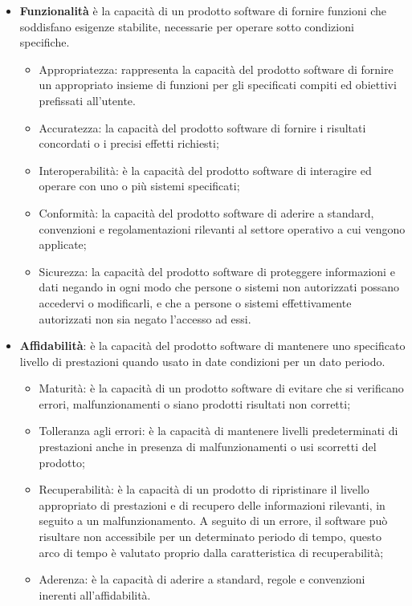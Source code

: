\begin{itemize}
\item \textbf{Funzionalità} è la capacità di un prodotto software di fornire funzioni che soddisfano esigenze stabilite, necessarie per operare sotto condizioni specifiche.
\begin{itemize}
\item Appropriatezza: rappresenta la capacità del prodotto software di fornire un appropriato insieme di funzioni per gli specificati compiti ed obiettivi prefissati all'utente.
\item Accuratezza: la capacità del prodotto software di fornire i risultati concordati o i precisi effetti richiesti;
\item Interoperabilità: è la capacità del prodotto software di interagire ed operare con uno o più sistemi specificati;
\item Conformità: la capacità del prodotto software di aderire a standard, convenzioni e regolamentazioni rilevanti al settore operativo a cui vengono applicate;
\item Sicurezza: la capacità del prodotto software di proteggere informazioni e dati negando in ogni modo che persone o sistemi non autorizzati possano accedervi o modificarli, e che a persone o sistemi effettivamente autorizzati non sia negato l’accesso ad essi.
\end{itemize}
\item \textbf{Affidabilità}: è la capacità del prodotto software di mantenere uno specificato livello di prestazioni quando usato in date condizioni per un dato periodo.
\begin{itemize}
\item Maturità: è la capacità di un prodotto software di evitare che si verificano errori, malfunzionamenti o siano prodotti risultati non corretti;
\item Tolleranza agli errori: è la capacità di mantenere livelli predeterminati di prestazioni anche in presenza di malfunzionamenti o usi scorretti del prodotto;
\item Recuperabilità: è la capacità di un prodotto di ripristinare il livello appropriato di prestazioni e di recupero delle informazioni rilevanti, in seguito a un malfunzionamento. A seguito di un errore, il software può risultare non accessibile per un determinato periodo di tempo, questo arco di tempo è valutato proprio dalla caratteristica di recuperabilità;
\item Aderenza: è la capacità di aderire a standard, regole e convenzioni inerenti all'affidabilità.

\end{itemize}
\end{itemize}
